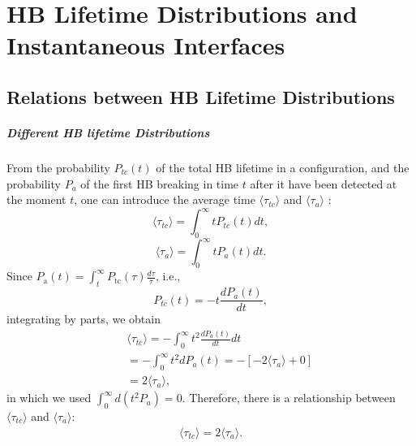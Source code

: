 \chapter{HB Lifetime Distributions and Instantaneous Interfaces}
\section{Relations between HB Lifetime Distributions}\label{relation_hbd}
\paragraph{Different HB lifetime Distributions}\label{diff_distr}
From the probability $P_{tc}(t)$ of the total HB lifetime in a configuration, and the probability $P_{a}$ of 
the first HB breaking in time $t$ after it have been detected at the moment $t$, one can introduce the average time 
$\langle \tau_{tc}\rangle$ and $\langle \tau_{a}\rangle$ :
\begin{equation}
\langle \tau_{tc}\rangle = \int_0^\infty t P_{tc}(t) dt,
\label{eq:tau_tc}
\end{equation}
\begin{equation}
\langle \tau_{a}\rangle = \int_0^\infty t P_a(t) dt. 
\label{eq:tau_a}
\end{equation}
Since $P_{\mathrm{a}}(t)=\int_{t}^{\infty} P_{\mathrm{tc}}(\tau) \frac{d \tau}{\tau}$, i.e., 
\begin{equation}
P_{tc}(t) = -t\frac{dP_a(t)}{dt}, \nonumber
\label{eq:relation_Ptc--Pa}
\end{equation}
integrating by parts, we obtain
\begin{eqnarray}
&&\langle \tau_{tc}\rangle = -\int_0^\infty t^2 \frac{dP_a(t)}{dt}dt \nonumber \\
&&= -\int_0^\infty t^2 dP_a(t) = -[-2\langle \tau_{a}\rangle + 0] \nonumber\\
&&= 2\langle \tau_{a}\rangle,\nonumber
\end{eqnarray}
in which we used $\int_0^\infty d(t^2 P_a)=0$.
Therefore, there is a relationship between $\langle \tau_{tc} \rangle$ and $\langle \tau_a \rangle$:
\begin{eqnarray}
\langle \tau_{tc}\rangle = 2\langle \tau_{a}\rangle.
\label{eq:relation_tau_tc--t_a}
\end{eqnarray}

